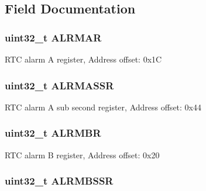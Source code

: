 \subsection{Field Documentation}
\hypertarget{struct_r_t_c___type_def_ac005b1a5bc52634d5a34578cc9d2c3f6}{
\subsubsection[{A\-L\-R\-M\-A\-R}]{ uint32\-\_\-t A\-L\-R\-M\-A\-R}}\label{struct_r_t_c___type_def_ac005b1a5bc52634d5a34578cc9d2c3f6}
R\-T\-C alarm A register, Address offset\-: 0x1\-C \hypertarget{struct_r_t_c___type_def_a61282fa74cede526af85fd9d20513646}{
\subsubsection[{A\-L\-R\-M\-A\-S\-S\-R}]{ uint32\-\_\-t A\-L\-R\-M\-A\-S\-S\-R}}\label{struct_r_t_c___type_def_a61282fa74cede526af85fd9d20513646}
R\-T\-C alarm A sub second register, Address offset\-: 0x44 \hypertarget{struct_r_t_c___type_def_a4e513deb9f58a138ad9f317cc5a3555d}{
\subsubsection[{A\-L\-R\-M\-B\-R}]{ uint32\-\_\-t A\-L\-R\-M\-B\-R}}\label{struct_r_t_c___type_def_a4e513deb9f58a138ad9f317cc5a3555d}
R\-T\-C alarm B register, Address offset\-: 0x20 \hypertarget{struct_r_t_c___type_def_a4ef7499da5d5beb1cfc81f7be057a7b2}{
\subsubsection[{A\-L\-R\-M\-B\-S\-S\-R}]{ uint32\-\_\-t A\-L\-R\-M\-B\-S\-S\-R}}\label{struct_r_t_c___type_def_a4ef7499da5d5beb1cfc81f7be057a7b2}
